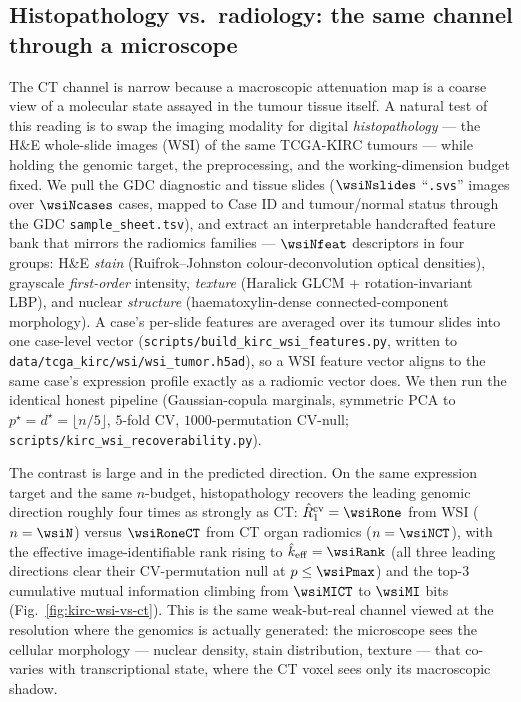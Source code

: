 \documentclass{article}
\begin{document}
\subsection{Histopathology vs.\ radiology: the same channel through a microscope}
\label{sec:kirc-wsi}
The CT channel is narrow because a macroscopic attenuation map is a coarse view
of a molecular state assayed in the tumour tissue itself. A natural test of this
reading is to swap the imaging modality for digital \emph{histopathology} --- the
H\&E whole-slide images (WSI) of the same TCGA-KIRC tumours --- while holding the
genomic target, the preprocessing, and the working-dimension budget fixed. We
pull the GDC diagnostic and tissue slides ($\wsiNslides$ ``\texttt{.svs}'' images
over $\wsiNcases$ cases, mapped to Case ID and tumour/normal status through the
GDC \texttt{sample\_sheet.tsv}), and extract an interpretable handcrafted feature
bank that mirrors the radiomics families --- $\wsiNfeat$ descriptors in four
groups: H\&E \emph{stain} (Ruifrok--Johnston colour-deconvolution optical
densities), grayscale \emph{first-order} intensity, \emph{texture}
(Haralick GLCM + rotation-invariant LBP), and nuclear \emph{structure}
(haematoxylin-dense connected-component morphology). A case's per-slide features
are averaged over its tumour slides into one case-level vector
(\texttt{scripts/build\_kirc\_wsi\_features.py}, written to
\texttt{data/tcga\_kirc/wsi/wsi\_tumor.h5ad}), so a WSI feature vector aligns to
the same case's expression profile exactly as a radiomic vector does. We then run
the identical honest pipeline (Gaussian-copula marginals, symmetric PCA to
$p^\star = d^\star = \lfloor n/5\rfloor$, $5$-fold CV, $1000$-permutation
CV-null; \texttt{scripts/kirc\_wsi\_recoverability.py}).

The contrast is large and in the predicted direction. On the same expression
target and the same $n$-budget, histopathology recovers the leading genomic
direction roughly four times as strongly as CT:
$\hat R_1^{\mathrm{cv}} = \wsiRone$ from WSI ($n=\wsiN$) versus
$\wsiRoneCT$ from CT organ radiomics ($n=\wsiNCT$), with the effective
image-identifiable rank rising to $\hat k_{\mathrm{eff}} = \wsiRank$
(all three leading directions clear their CV-permutation null at $p \le
\wsiPmax$) and the top-$3$ cumulative mutual information climbing from
$\wsiMICT$ to $\wsiMI$ bits (Fig.~\ref{fig:kirc-wsi-vs-ct}). This is the same
weak-but-real channel viewed at the resolution where the genomics is actually
generated: the microscope sees the cellular morphology --- nuclear density,
stain distribution, texture --- that co-varies with transcriptional state, where
the CT voxel sees only its macroscopic shadow.
\end{document}
